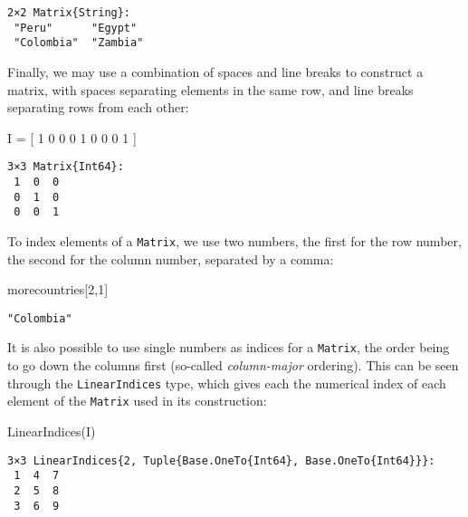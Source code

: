 \documentclass[
  letterpaper,
  DIV=11,
  numbers=noendperiod]{scrreprt}
\newenvironment{Shaded}{\begin{snugshade}}{\end{snugshade}}
\newcommand{\FloatTok}[1]{\textcolor[rgb]{0.68,0.00,0.00}{#1}}
\newcommand{\FunctionTok}[1]{\textcolor[rgb]{0.28,0.35,0.67}{#1}}
\newcommand{\NormalTok}[1]{\textcolor[rgb]{0.00,0.23,0.31}{#1}}
\newcommand{\OperatorTok}[1]{\textcolor[rgb]{0.37,0.37,0.37}{#1}}
\begin{document}
\begin{verbatim}
2×2 Matrix{String}:
 "Peru"      "Egypt"
 "Colombia"  "Zambia"
\end{verbatim}

Finally, we may use a combination of spaces and line breaks to construct
a matrix, with spaces separating elements in the same row, and line
breaks separating rows from each other:

\begin{Shaded}
\begin{Highlighting}[]
\NormalTok{I }\OperatorTok{=}\NormalTok{ [ }\FloatTok{1} \FloatTok{0} \FloatTok{0} 
      \FloatTok{0} \FloatTok{1} \FloatTok{0} 
      \FloatTok{0} \FloatTok{0} \FloatTok{1}\NormalTok{ ]}
\end{Highlighting}
\end{Shaded}

\begin{verbatim}
3×3 Matrix{Int64}:
 1  0  0
 0  1  0
 0  0  1
\end{verbatim}

To index elements of a \texttt{Matrix}, we use two numbers, the first
for the row number, the second for the column number, separated by a
comma:

\begin{Shaded}
\begin{Highlighting}[]
\NormalTok{morecountries[}\FloatTok{2}\NormalTok{,}\FloatTok{1}\NormalTok{]}
\end{Highlighting}
\end{Shaded}

\begin{verbatim}
"Colombia"
\end{verbatim}

It is also possible to use single numbers as indices for a
\texttt{Matrix}, the order being to go down the columns first (so-called
\emph{column-major} ordering). This can be seen through the
\texttt{LinearIndices} type, which gives each the numerical index of
each element of the \texttt{Matrix} used in its construction:

\begin{Shaded}
\begin{Highlighting}[]
\FunctionTok{LinearIndices}\NormalTok{(I)}
\end{Highlighting}
\end{Shaded}

\begin{verbatim}
3×3 LinearIndices{2, Tuple{Base.OneTo{Int64}, Base.OneTo{Int64}}}:
 1  4  7
 2  5  8
 3  6  9
\end{verbatim}
\end{document}
